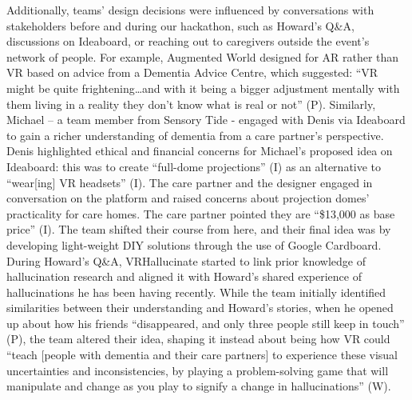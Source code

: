 Additionally, teams’ design decisions were influenced by conversations with stakeholders before and during our hackathon, such as Howard’s Q\&A, discussions on Ideaboard, or reaching out to caregivers outside the event’s network of people. For example, Augmented World designed for AR rather than VR based on advice from a Dementia Advice Centre, which suggested: “VR might be quite frightening…and with it being a bigger adjustment mentally with them living in a reality they don’t know what is real or not” (P). Similarly, Michael – a team member from Sensory Tide - engaged with Denis via Ideaboard to gain a richer understanding of dementia from a care partner’s perspective. Denis highlighted ethical and financial concerns for Michael’s proposed idea on Ideaboard: this was to create “full-dome projections” (I) as an alternative to “wear[ing] VR headsets” (I). The care partner and the designer engaged in conversation on the platform and raised concerns about projection domes’ practicality for care homes. The care partner pointed they are “\$13,000 as base price” (I). The team shifted their course from here, and their final idea was by developing light-weight DIY solutions through the use of Google Cardboard. During Howard’s Q\&A, VRHallucinate started to link prior knowledge of hallucination research and aligned it with Howard’s shared experience of hallucinations he has been having recently. While the team initially identified similarities between their understanding and Howard’s stories, when he opened up about how his friends “disappeared, and only three people still keep in touch” (P), the team altered their idea, shaping it instead about being how VR could “teach [people with dementia and their care partners] to experience these visual uncertainties and inconsistencies, by playing a problem-solving game that will manipulate and change as you play to signify a change in hallucinations” (W). 
